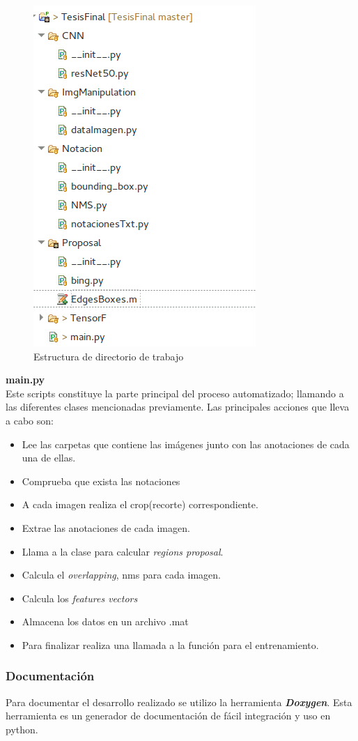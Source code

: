 \begin{figure}[H]
 \centering
  \includegraphics[scale=0.4,keepaspectratio=true,clip=true]{imagenes/Logos/structureData.png}
  \caption{Estructura de directorio de trabajo}
\end{figure}


\textbf{main.py}\\
Este scripts constituye la parte principal del proceso automatizado; llamando a las diferentes clases mencionadas previamente. Las principales 
acciones que lleva a cabo son:
\begin{itemize}
 \item Lee las carpetas que contiene las imágenes junto con las anotaciones de cada una de ellas.
 \item Comprueba que exista las notaciones
 \item A cada imagen realiza el crop(recorte) correspondiente.
 \item Extrae las anotaciones de cada imagen.
 \item Llama a la clase para calcular \textit{regions proposal}.
 \item Calcula el \textit{overlapping}, \ac{nms} para cada imagen.
 \item Calcula los \textit{features vectors}
 \item Almacena los datos en un archivo .mat
 \item Para finalizar realiza una llamada a la función para el entrenamiento.
\end{itemize}

\subsubsection*{Documentación}\label{sub:documentacion}
Para documentar el desarrollo realizado se utilizo la herramienta \textbf{\textit{Doxygen}}. Esta herramienta es un generador de documentación de fácil integración y uso en python.